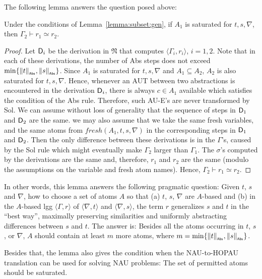 \documentclass{llncs}
\newcommand{\frN}{\mathfrak N}
\newcommand{\np}[2]{\langle #1, \allowbreak #2\rangle}
\newcommand{\abscard}[1]{\|#1\|_{_{\sf Abs}}}
\newcommand{\unused}{\mathit{fresh}}
\begin{document}
The following lemma answers the question posed above:
\begin{lemma}
  \label{lemma:saturation}
  Under the conditions of Lemma~\ref{lemma:subset:gen}, if $A_1$ is
  saturated for $t,s,\nabla$, then $\Gamma_2\vdash r_1\simeq r_2$. 
\end{lemma}
\begin{proof}
  Let ${\sf D}_i$ be the derivation in $\frN$ that computes
  $\np{\Gamma_i}{r_i}$, $i=1,2$. Note that in each of these
  derivations, the number of \textsf{Abs} steps does not exceed
  $\min\{\abscard{t},\abscard{s}\}$. Since $A_1$ is saturated for
  $t,s,\nabla$ and $A_1\subseteq A_2$, $A_2$ is also saturated for
  $t,s,\nabla$. Hence, whenever an AUT between two abstractions is
  encountered in the derivation ${\sf D}_i$, there is always $c\in
  A_1$ available which satisfies the condition of the \textsf{Abs}
  rule. Therefore, such AU-E's are never transformed by
  \textsf{Sol}. We can assume without loss of generality that the
  sequence of steps in ${\sf D}_1$ and ${\sf D}_2$ are the same. we
  may also assume that we take the same fresh variables, and the same
  atoms from $\unused(A_1,t,s,\nabla)$ in the corresponding steps in
  ${\sf D}_1$ and ${\sf D}_2$. Then the only difference between these
  derivations is in the $\Gamma$'s, caused by the \textsf{Sol} rule
  which might eventually make $\Gamma_2$ larger than $\Gamma_1$. The
  $\sigma$'s computed by the derivations are the same and, therefore,
  $r_1$ and $r_2$ are the same (modulo the assumptions on the variable
  and fresh atom names). Hence, $\Gamma_2 \vdash r_1 \simeq r_2$.
\end{proof}

In other words, this lemma answers the following pragmatic question:
Given $t$, $s$ and $\nabla$, how to choose a set of atoms $A$ so that
(a) $t$, $s$, $\nabla$ are $A$-based and (b) in the $A$-based lgg
$\np{\Gamma}{r}$ of $\np{\nabla}{t}$ and $\np{\nabla}{s}$, the term
$r$ generalizes $s$ and $t$ in the ``best way'', maximally preserving
similarities and uniformly abstracting differences between $s$ and
$t$. The answer is: Besides all the atoms occurring in $t$, $s$, or
$\nabla$, $A$ should contain at least $m$ more atoms, where
$m=\min\{\abscard{t},\abscard{s}\}$.

Besides that, the lemma also gives the condition when the NAU-to-HOPAU translation can be used for solving NAU problems: The set of permitted atoms should be saturated. 
\end{document}
